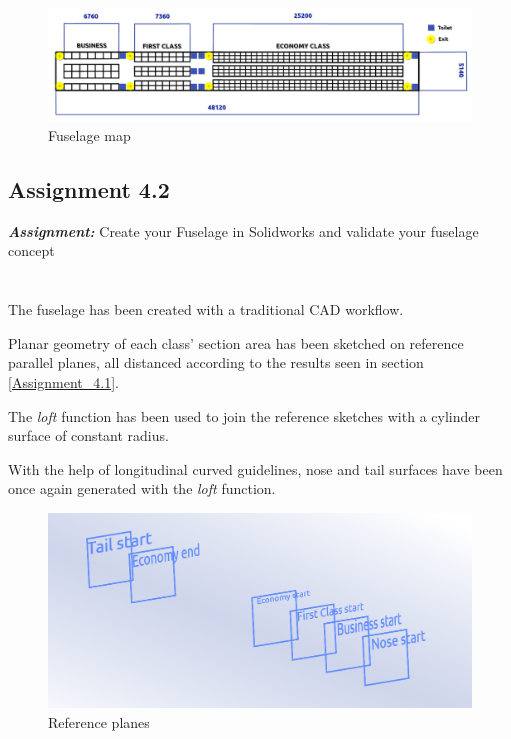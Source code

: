 \documentclass{article}
\begin{document}
\clearpage

\begin{figure}[h!]
    \centering
    \includegraphics[width=\textwidth]{Sources/Plots_and_Pictures/fuselage_map.png}
    \caption{Fuselage map}
    \label{fuselage_map}
\end{figure}

\clearpage
\subsection{Assignment 4.2\label{Assignment_4.2}}

\textbf{\textit{Assignment:}} Create your Fuselage in Solidworks 
and validate your fuselage concept \\ \\ \\ 

The fuselage has been created with a traditional CAD workflow. 

Planar geometry of each class'
section area has been sketched on reference parallel planes, all distanced according to the results
seen in section \ref{Assignment_4.1}. 

The \textit{loft} function has been used 
to join the reference sketches with a cylinder surface of constant radius.

With the help of longitudinal curved guidelines, nose and tail surfaces have been once again
generated with the \textit{loft} function.


\begin{figure}[h!]
    \centering
    \includegraphics[width=\textwidth]{Sources/Plots_and_Pictures/reference_planes_fuselage.png}
    \caption{Reference planes}
    \label{fuselage_reference_planes}
\end{figure}
\end{document}
